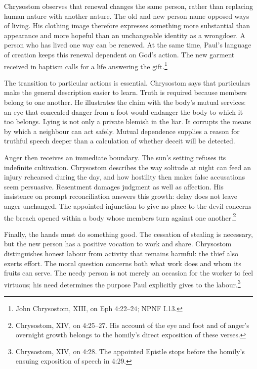 Chrysostom observes that renewal changes the same person, rather than
replacing human nature with another nature. The old and new person name
opposed ways of living. His clothing image therefore expresses something
more substantial than appearance and more hopeful than an unchangeable
identity as a wrongdoer. A person who has lived one way can be renewed.
At the same time, Paul's language of creation keeps this renewal dependent
on God's action. The new garment received in baptism calls for a life
answering the gift.\footnote{John Chrysostom, 
XIII, on Eph 4:22--24; NPNF I.13.}

The transition to particular actions is essential. Chrysostom says that
particulars make the general description easier to learn. Truth is required
because members belong to one another. He illustrates the claim with the
body's mutual services: an eye that concealed danger from a foot would
endanger the body to which it too belongs. Lying is not only a private
blemish in the liar. It corrupts the means by which a neighbour can act
safely. Mutual dependence supplies a reason for truthful speech deeper
than a calculation of whether deceit will be detected.

Anger then receives an immediate boundary. The sun's setting refuses its
indefinite cultivation. Chrysostom describes the way solitude at night
can feed an injury rehearsed during the day, and how hostility then makes
false accusations seem persuasive. Resentment damages judgment as well
as affection. His insistence on prompt reconciliation answers this growth:
delay does not leave anger unchanged. The appointed injunction to give
no place to the devil concerns the breach opened within a body whose
members turn against one another.\footnote{Chrysostom, 
XIV, on 4:25--27. His account of the eye and foot and of anger's overnight
growth belongs to the homily's direct exposition of these verses.}

Finally, the hands must do something good. The cessation of stealing is
necessary, but the new person has a positive vocation to work and share.
Chrysostom distinguishes honest labour from activity that remains harmful:
the thief also exerts effort. The moral question concerns both what work
does and whom its fruits can serve. The needy person is not merely an
occasion for the worker to feel virtuous; his need determines the purpose
Paul explicitly gives to the labour.\footnote{Chrysostom, 
XIV, on 4:28. The appointed Epistle stops before the homily's ensuing
exposition of speech in 4:29.}

